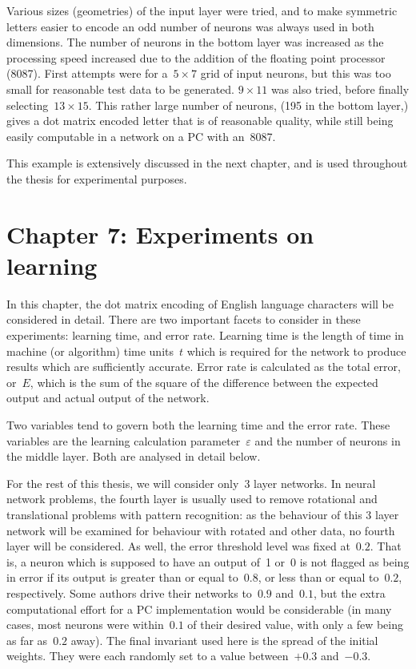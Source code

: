 \documentclass[12pt]{report}
\begin{document}
Various sizes (geometries) of the input layer were tried, and to make symmetric
letters easier to encode an odd number of neurons was always used in
both dimensions.
The number of neurons in the bottom layer was increased as the
processing speed increased due to the addition of the floating
point processor (8087).
First attempts were for a~$5\times 7$ grid of input neurons, but this
was too small for reasonable test data to be generated.
$9\times 11$ was also tried, before finally selecting~$13\times 15$.
This rather large number of neurons, (195 in the bottom layer,) gives
a dot matrix encoded letter that is of reasonable quality, while
still being easily computable in a network on a PC with
an~8087.

This example is extensively discussed in the next chapter, and is
used throughout the thesis for experimental purposes.


\chapter{Chapter 7: Experiments on learning}

In this chapter, the dot matrix encoding of English language
characters will be considered in detail.
There are two important facets to consider in these experiments:
learning time, and error rate.
Learning time is the length of time in machine (or algorithm) time
units~$t$ which is required for the network to produce results which
are sufficiently accurate.
Error rate is calculated as the total error, or~$E$, which is the
sum of the square of the difference between the expected output and
actual output of the network.

Two variables tend to govern both the learning time and the error
rate.
These variables are the learning calculation parameter~$\varepsilon$ and
the number of neurons in the middle layer.
Both are analysed in detail below.

For the rest of this thesis, we will consider only~3 layer networks.
In neural network problems, the fourth layer is usually used to remove
rotational and translational problems with pattern recognition: as
the behaviour of this 3 layer network will be examined for behaviour
with rotated and other data, no fourth layer will be considered.
As well, the error threshold level was fixed at~$0.2$.
That is, a neuron which is supposed to have an output of~1 or~0 is
not flagged as being in error if its output is greater than or equal
to~$0.8$, or less than or equal to~$0.2$, respectively.
Some authors drive their networks to~$0.9$ and~$0.1$, but the extra
computational effort for a PC implementation would be considerable
(in many cases, most neurons were within~$0.1$ of their desired
value, with only a few being as far as~$0.2$ away).
The final invariant used here is the spread of the initial weights.
They were each randomly set to a value between~$+0.3$ and~$-0.3$.
\end{document}
